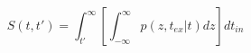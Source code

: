 \begin{equation}
S(t,t') = \int_{t'}^{\infty} \left[ \int_{-\infty}^\infty p(z,t_{ex}|t) dz\right] dt_{in}
\end{equation}